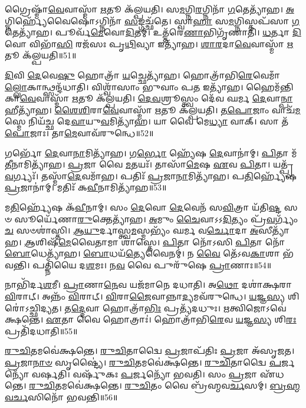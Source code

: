 𑌗𑍍𑌰𑍈𑌷𑍍𑌮𑌾᳴\-\ul{𑌵𑍇}\-𑌵𑌾𑌸𑍍𑌮𑌾᳴ \ul{𑌋}\-𑌤𑍂 𑌕᳴𑌲𑍍𑌪𑌯𑌤𑌿। 
𑌸\-\ul{𑌮}\-𑌗𑍍𑌨𑌿\-\ul{𑌰}\-𑌗𑍍𑌨𑌿𑌨𑌾᳴ \ul{𑌗}\-𑌤𑍇𑌤𑍍𑌯𑌾᳴𑌹। 
\-\ul{𑌅}\-𑌗𑍍𑌨𑌿𑌰𑍍𑌹𑍍𑌯𑍇᳴𑌵𑍈𑌷𑍋॑𑌽𑌗𑍍𑌨𑌿𑌨𑌾᳴ \ul{𑌸}\-𑌙𑍍𑌗𑌚𑍍𑌛᳴𑌤𑍇। 
𑌸𑍍𑌵𑌾\-\ul{𑌹𑌾} 𑌸\-\ul{𑌮}\-𑌗𑍍𑌨𑌿𑌸𑍍𑌤𑌪᳴𑌸𑌾 \ul{𑌗}\-𑌤𑍇𑌤𑍍𑌯𑌾᳴𑌹। 
𑌪𑍂𑌰𑍍𑌵᳴\-\ul{𑌮𑍇}\-𑌵𑍋\-\ul{𑌦𑌿}\-𑌤𑌮𑍍। 
𑌉𑌤𑍍𑌤᳴𑌰𑍇\-\ul{𑌣𑌾}\-𑌭𑌿𑌗𑍃᳴𑌣𑌾𑌤𑌿। 
\-\ul{𑌧}\-𑌰𑍍𑌤𑌾 \ul{𑌦𑌿}\-𑌵𑍋 𑌵𑌿𑌭𑌾᳴\-\ul{𑌸𑌿} 𑌰𑌜᳴𑌸𑌃 𑌪𑍃\-\ul{𑌥𑌿}\-𑌵𑍍𑌯𑌾 𑌇𑌤𑍍𑌯𑌾᳴𑌹। 
\-\ul{𑌶𑌾}\-\-\ul{𑌰}\-𑌦𑌾\-\ul{𑌵𑍇}\-𑌵𑌾𑌸𑍍𑌮𑌾᳴ \ul{𑌋}\-𑌤𑍂 𑌕᳴𑌲𑍍𑌪𑌯𑌤𑌿॥51॥

\-\ul{𑌦𑌿}\-𑌵𑌿 \ul{𑌦𑍇}\-𑌵𑍇\-\ul{𑌷𑍁} 𑌹𑍋𑌤𑍍𑌰𑌾᳴ \ul{𑌯}\-𑌚𑍍𑌛𑍇𑌤𑍍𑌯𑌾᳴𑌹। 
𑌹𑍋𑌤𑍍𑌰𑌾᳴𑌭𑌿\-\ul{𑌰𑍇}\-𑌵𑍇𑌮𑌾𑌁\-\ul{𑌲𑍍𑌲𑍋}\-𑌕𑌾𑌨𑍍𑌥𑍍𑌸𑌨𑍍𑌦᳴\-𑌧𑌾𑌤𑌿। 
𑌵𑌿𑌶𑍍𑌵𑌾᳴𑌸𑌾𑌂 𑌭𑍁𑌵𑌾𑌂 𑌪\-\ul{𑌤} 𑌇𑌤𑍍𑌯𑌾᳴𑌹। 
𑌹𑍈𑌮᳴𑌨𑍍𑌤𑌿𑌕𑌾\-\ul{𑌵𑍇}\-𑌵𑌾𑌸𑍍𑌮𑌾᳴ \ul{𑌋}\-𑌤𑍂 𑌕᳴𑌲𑍍𑌪𑌯𑌤𑌿। 
\-\ul{𑌦𑍇}\-\-\ul{𑌵}\-𑌶𑍍𑌰𑍂𑌸𑍍𑌤𑍍𑌵𑌂 𑌦𑍇᳴𑌵 𑌘𑌰𑍍𑌮 \ul{𑌦𑍇}\-𑌵𑌾\-\ul{𑌨𑍍𑌪𑌾}\-𑌹𑍀𑌤𑍍𑌯𑌾᳴𑌹। 
\-\ul{𑌶𑍈}\-\-\ul{𑌶𑌿}\-𑌰𑌾\-\ul{𑌵𑍇}\-𑌵𑌾𑌸𑍍𑌮𑌾᳴ \ul{𑌋}\-𑌤𑍂 𑌕᳴𑌲𑍍𑌪𑌯𑌤𑌿। 
\-\ul{𑌤}\-\-\ul{𑌪𑍋}\-𑌜𑌾𑌂 𑌵𑌾𑌚᳴\-\ul{𑌮}\-𑌸𑍍𑌮𑍇 𑌨𑌿𑌯᳴𑌚𑍍𑌛 𑌦𑍇\-\ul{𑌵𑌾}\-𑌯𑍁\-\ul{𑌵}\-𑌮𑌿𑌤𑍍𑌯𑌾᳴𑌹। 
𑌯𑌾 𑌵𑍈 𑌮𑍇\-\ul{𑌧𑍍𑌯𑌾} 𑌵𑌾𑌕𑍍। 
𑌸𑌾 𑌤᳴\-\ul{𑌪𑍋}\-𑌜𑌾𑌃। 
𑌤𑌾\-\ul{𑌮𑍇}\-𑌵𑌾𑌵᳴𑌰𑍁𑌨𑍍𑌧𑍇॥52॥

𑌗𑌰𑍍𑌭𑍋᳴ \ul{𑌦𑍇}\-𑌵𑌾\-\ul{𑌨𑌾}\-𑌮𑌿𑌤𑍍𑌯𑌾᳴𑌹। 
𑌗\-\ul{𑌰𑍍𑌭𑍋} 𑌹𑍍𑌯𑍇᳴𑌷 \ul{𑌦𑍇}\-𑌵𑌾𑌨𑌾॑𑌮𑍍। 
\-\ul{𑌪𑌿}\-𑌤𑌾 𑌮᳴\-\ul{𑌤𑍀}\-𑌨𑌾𑌮𑌿𑌤𑍍𑌯𑌾᳴𑌹। 
\-\ul{𑌪𑍍𑌰}\-𑌜𑌾 𑌵𑍈 \ul{𑌮}\-𑌤𑌯𑌃᳴। 
𑌤𑌾𑌸𑌾᳴\-\ul{𑌮𑍇}\-𑌷 \ul{𑌏}\-𑌵 \ul{𑌪𑌿}\-𑌤𑌾। 
𑌯𑌤𑍍𑌪𑍍𑌰᳴\-\ul{𑌵}\-𑌰𑍍𑌗𑍍𑌯𑌃᳴। 
𑌤𑌸𑍍𑌮𑌾᳴\-\ul{𑌦𑍇}\-𑌵𑌮𑌾᳴𑌹। 
𑌪𑌤𑌿𑌃᳴ \ul{𑌪𑍍𑌰}\-𑌜𑌾\-\ul{𑌨𑌾}\-𑌮𑌿𑌤𑍍𑌯𑌾᳴𑌹। 
𑌪\-\ul{𑌤𑌿}\-𑌰𑍍𑌹𑍍𑌯𑍇᳴𑌷 \ul{𑌪𑍍𑌰}\-𑌜𑌾𑌨𑌾॑𑌮𑍍। 
𑌮𑌤𑌿𑌃᳴ 𑌕\-\ul{𑌵𑍀}\-𑌨𑌾\-𑌮𑌿𑌤𑍍𑌯𑌾᳴𑌹॥53॥

𑌮\-\ul{𑌤𑌿}\-𑌰𑍍𑌹𑍍𑌯𑍇᳴𑌷 𑌕᳴\-\ul{𑌵𑍀}\-𑌨𑌾𑌮𑍍। 
𑌸𑌂 \ul{𑌦𑍇}\-𑌵𑍋 \ul{𑌦𑍇}\-𑌵𑍇𑌨᳴ 𑌸\-\ul{𑌵𑌿}\-𑌤𑍍𑌰𑌾 𑌯᳴𑌤𑌿\-\ul{𑌷𑍍𑌟} 𑌸𑍞 𑌸𑍂𑌰𑍍𑌯𑍇᳴𑌣𑌾\-\ul{𑌰𑍁}\-𑌕𑍍𑌤𑍇𑌤𑍍𑌯𑌾᳴𑌹। 
\-\ul{𑌅}\-𑌮𑍁𑌂 \ul{𑌚𑍈}\-𑌵𑌾𑌽𑌽\-\ul{𑌦𑌿}\-𑌤𑍍𑌯𑌂 𑌪𑍍𑌰᳴\-\ul{𑌵}\-𑌰𑍍𑌗𑍍𑌯𑌂᳴ \ul{𑌚} 𑌸𑍞𑌶𑌾॑𑌸𑍍𑌤𑌿। 
\-\ul{𑌆}\-\-\ul{𑌯𑍁}\-𑌰𑍍𑌦𑌾𑌸𑍍𑌤𑍍𑌵\-\ul{𑌮}\-𑌸𑍍𑌮𑌭𑍍𑌯𑌂᳴ 𑌘𑌰𑍍𑌮 𑌵\-\ul{𑌰𑍍𑌚𑍋}\-𑌦𑌾 \ul{𑌅}\-𑌸𑍀𑌤𑍍𑌯𑌾᳴𑌹। 
\-\ul{𑌆}\-𑌶𑌿𑌷᳴\-\ul{𑌮𑍇}\-𑌵𑍈𑌤𑌾𑌮𑌾 𑌶𑌾॑𑌸𑍍𑌤𑍇। 
\-\ul{𑌪𑌿}\-𑌤𑌾 𑌨𑍋᳴𑌽𑌸𑌿 \ul{𑌪𑌿}\-𑌤𑌾 𑌨𑍋᳴ \ul{𑌬𑍋}\-𑌧𑍇𑌤𑍍𑌯𑌾᳴𑌹। 
\-\ul{𑌬𑍋}\-𑌧𑌯᳴\-\ul{𑌤𑍍𑌯𑍇}\-𑌵𑍈𑌨𑌮𑍍॑। 
𑌨 \ul{𑌵𑍈} 𑌤𑍇᳴𑌽𑌵\-\ul{𑌕𑌾}\-𑌶𑌾 𑌭᳴𑌵𑌨𑍍𑌤𑌿। 
𑌪𑌤𑍍𑌨𑌿᳴𑌯𑍈 𑌦\-\ul{𑌶}\-𑌮𑌃। 
𑌨\-\ul{𑌵} 𑌵𑍈 𑌪𑍁𑌰𑍁᳴𑌷𑍇 \ul{𑌪𑍍𑌰𑌾}\-𑌣𑌾𑌃॥54॥

𑌨𑌾𑌭𑌿᳴𑌰𑍍𑌦\-\ul{𑌶}\-𑌮𑍀। 
\-\ul{𑌪𑍍𑌰𑌾}\-𑌣𑌾\-\ul{𑌨𑍇}\-𑌵 𑌯𑌜᳴𑌮𑌾𑌨𑍇 𑌦𑌧𑌾𑌤𑌿। 
𑌅\-\ul{𑌥𑍋} 𑌦𑌶𑌾॑𑌕𑍍𑌷𑌰𑌾 \ul{𑌵𑌿}\-𑌰𑌾𑌟𑍍। 
𑌅𑌨𑍍𑌨𑌂᳴  \ul{𑌵𑌿}\-𑌰𑌾𑌟𑍍। 
\-\ul{𑌵𑌿}\-𑌰𑌾\-\ul{𑌜𑍈}\-𑌵𑌾𑌨𑍍𑌨𑌾\-\ul{𑌦𑍍𑌯}\-𑌮𑌵᳴𑌰𑍁𑌨𑍍𑌧𑍇। 
\-\ul{𑌯}\-𑌜𑍍𑌞\-\ul{𑌸𑍍𑌯} 𑌶𑌿𑌰𑍋॑𑌽𑌚𑍍𑌛𑌿𑌦𑍍𑌯𑌤। 
𑌤\-\ul{𑌦𑍍𑌦𑍇}\-𑌵𑌾 𑌹𑍋𑌤𑍍𑌰𑌾᳴\-\ul{𑌭𑌿𑌃} 𑌪𑍍𑌰𑌤𑍍𑌯᳴𑌦𑌧𑍁𑌃। 
\-\ul{𑌋}\-𑌤𑍍𑌵𑌿𑌜𑍋𑌽𑌵𑍇॑𑌕𑍍𑌷𑌨𑍍𑌤𑍇। 
\-\ul{𑌏}\-𑌤𑌾 𑌵𑍈 𑌹𑍋𑌤𑍍𑌰𑌾𑌃॑। 
𑌹𑍋𑌤𑍍𑌰𑌾᳴𑌭𑌿\-\ul{𑌰𑍇}\-𑌵 \ul{𑌯}\-𑌜𑍍𑌞\-\ul{𑌸𑍍𑌯} 𑌶𑌿\-\ul{𑌰𑌃} 𑌪𑍍𑌰𑌤𑌿᳴𑌦𑌧𑌾𑌤𑌿॥55॥

\-\ul{𑌰𑍁}\-\-\ul{𑌚𑌿}\-𑌤𑌮𑌵𑍇॑𑌕𑍍𑌷𑌨𑍍𑌤𑍇। 
\-\ul{𑌰𑍁}\-\-\ul{𑌚𑌿}\-𑌤𑌾𑌦𑍍𑌵𑍈 \ul{𑌪𑍍𑌰}\-𑌜𑌾𑌪᳴𑌤𑌿𑌃 \ul{𑌪𑍍𑌰}\-𑌜𑌾 𑌅᳴𑌸𑍃𑌜𑌤। 
\-\ul{𑌪𑍍𑌰}\-𑌜𑌾\-\ul{𑌨𑌾}\-\-\ul{𑍞} 𑌸𑍃𑌷𑍍𑌟𑍍𑌯𑍈॑। 
\-\ul{𑌰𑍁}\-\-\ul{𑌚𑌿}\-𑌤𑌮𑌵𑍇॑𑌕𑍍𑌷𑌨𑍍𑌤𑍇। 
\-\ul{𑌰𑍁}\-\-\ul{𑌚𑌿}\-𑌤𑌾𑌦𑍍𑌵𑍈 \ul{𑌪}\-𑌰𑍍𑌜𑌨𑍍𑌯𑍋᳴ 𑌵𑌰𑍍\mbox{}𑌷𑌤𑌿। 
𑌵𑌰𑍍\mbox{}𑌷𑍁᳴𑌕𑌃 \ul{𑌪}\-𑌰𑍍𑌜𑌨𑍍𑌯𑍋᳴ 𑌭𑌵𑌤𑌿। 
𑌸𑌂 \ul{𑌪𑍍𑌰}\-𑌜𑌾 𑌏᳴𑌧𑌨𑍍𑌤𑍇। 
\-\ul{𑌰𑍁}\-\-\ul{𑌚𑌿}\-𑌤𑌮𑌵𑍇॑𑌕𑍍𑌷𑌨𑍍𑌤𑍇। 
\-\ul{𑌰𑍁}\-\-\ul{𑌚𑌿}\-𑌤𑌂 𑌵𑍈 𑌬𑍍𑌰᳴𑌹𑍍𑌮𑌵\-\ul{𑌰𑍍𑌚}\-𑌸𑌮𑍍। 
\-\ul{𑌬𑍍𑌰}\-\-\ul{𑌹𑍍𑌮}\-\-\ul{𑌵}\-\-\ul{𑌰𑍍𑌚}\-𑌸𑌿𑌨𑍋᳴ 𑌭𑌵𑌨𑍍𑌤𑌿॥56॥

